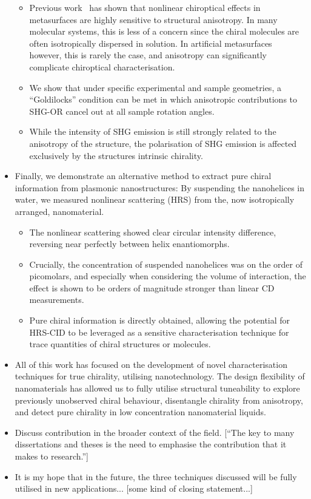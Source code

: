 \begin{itemize}
    \begin{itemize}
        \item Previous work~\cite{Hooper2017} has shown that nonlinear chiroptical effects in metasurfaces are highly sensitive to structural anisotropy. In many molecular systems, this is less of a concern since the chiral molecules are often isotropically dispersed in solution. In artificial metasurfaces however, this is rarely the case, and anisotropy can significantly complicate chiroptical characterisation.
        \item We show that under specific experimental and sample geometries, a ``Goldilocks'' condition can be met in which anisotropic contributions to SHG-OR cancel out at all sample rotation angles. 
        \item While the intensity of SHG emission is still strongly related to the anisotropy of the structure, the polarisation of SHG emission is affected exclusively by the structures intrinsic chirality.
    \end{itemize}
    \item Finally, we demonstrate an alternative method to extract pure chiral information from plasmonic nanostructures: By suspending the nanohelices in water, we measured nonlinear scattering (HRS) from the, now isotropically arranged, nanomaterial.
    \begin{itemize}
        \item The nonlinear scattering showed clear circular intensity difference, reversing near perfectly between helix enantiomorphs.
        \item Crucially, the concentration of suspended nanohelices was on the order of picomolars, and especially when considering the volume of interaction, the effect is shown to be orders of magnitude stronger than linear CD measurements.
        \item Pure chiral information is directly obtained, allowing the potential for HRS-CID to be leveraged as a sensitive characterisation technique for trace quantities of chiral structures or molecules.
    \end{itemize}
    
    \item All of this work has focused on the development of novel characterisation techniques for true chirality, utilising nanotechnology. The design flexibility of nanomaterials has allowed us to fully utilise structural tuneability to explore previously unobserved chiral behaviour, disentangle chirality from anisotropy, and detect pure chirality in low concentration nanomaterial liquids.

    \item Discuss contribution in the broader context of the field. [``The key to many dissertations and theses is the need to emphasise the contribution that it makes to research.'']

    \item It is my hope that in the future, the three techniques discussed will be fully utilised in new applications... [some kind of closing statement...]

\end{itemize}
\color{black}